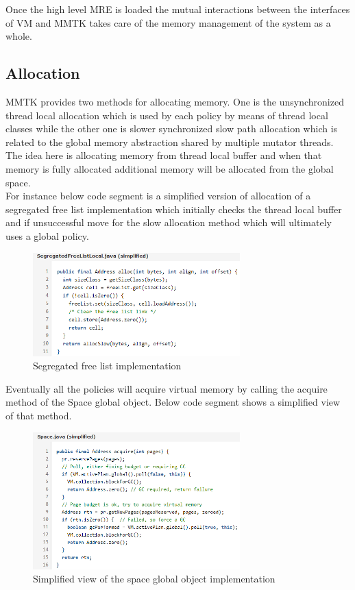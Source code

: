 Once the high level MRE is loaded the mutual interactions between the interfaces of VM and MMTK takes care of the memory management of the system as a whole.

\subsection{Allocation}
MMTK provides two methods for allocating memory. One is the unsynchronized thread local allocation which is used by each policy by means of thread local classes while the other one is slower synchronized slow path allocation which is related to the global memory abstraction shared by multiple mutator threads. The idea here is allocating memory from thread local buffer and when that memory is fully allocated additional memory will be allocated from the global space.\\

For instance below code segment is a simplified version of allocation of a segregated free list implementation which initially checks the thread local buffer and if unsuccessful move for the slow allocation method which will ultimately uses a global policy.\\

\begin{figure}[ht!]
\centering
\includegraphics[width=80mm]{code_1.png}
\caption{Segregated free list implementation}
\label{fig:mmtk}
\end{figure}

Eventually all the policies will acquire virtual memory by calling the acquire method of the Space global object. Below code segment shows a simplified view of that method.\\

\begin{figure}[ht!]
\centering
\includegraphics[width=80mm]{code_2.png}
\caption{Simplified view of the space global object implementation}
\label{fig:mmtk}
\end{figure}


